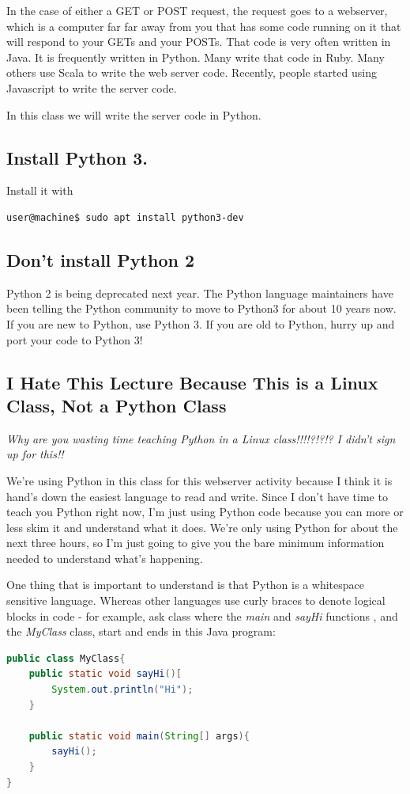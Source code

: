 \documentclass[10pt]{article}
\begin{document}
In the case of either a GET or POST request, the request goes to a webserver, which is a computer far far away from you that has some code running on it that will respond to your GETs and your POSTs. That code is very often written in Java. It is frequently written in Python. Many write that code in Ruby. Many others use Scala to write the web server code. Recently, people started using Javascript to write the server code. 

In this class we will write the server code in Python.

\subsection{Install Python 3.}

Install it with 

\begin{lstlisting}
user@machine$ sudo apt install python3-dev
\end{lstlisting}

\subsection{Don't install Python 2}
Python 2 is being deprecated next year. The Python language maintainers have been telling the Python community to move to Python3 for about 10 years now. If you are new to Python, use Python 3. If you are old to Python, hurry up and port your code to Python 3!

\subsection{I Hate This Lecture Because This is a Linux Class, Not a Python Class}
\textit{Why are you wasting time teaching Python in a Linux class!!!!?!?!? I didn't sign up for this!!}

We're using Python in this class for this webserver activity because I think it is hand's down the easiest language to read and write. Since I don't have time to teach you Python right now, I'm just using Python code because you can more or less skim it and understand what it does. We're only using Python for about the next three hours, so I'm just going to give you  the bare minimum information needed to understand what's happening.

One thing that is important to understand is that Python is a whitespace sensitive language. Whereas other languages use curly braces to denote logical blocks in code - for example, ask class where the \textit{main} and \textit{sayHi} functions , and the \textit{MyClass} class, start and ends in this Java program:
\begin{lstlisting}[language=Java]
public class MyClass{
	public static void sayHi()[
		System.out.println("Hi");
	}

	public static void main(String[] args){
		sayHi();
	}
}
\end{lstlisting}
\end{document}

